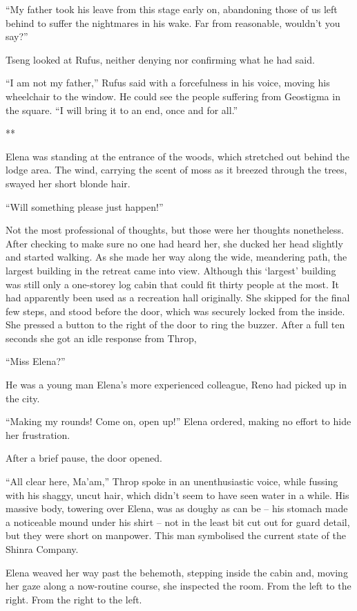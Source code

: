 \documentclass[oneside]{book}
\begin{document}
“My father took his leave from this stage early on, abandoning those of us left behind to suffer the nightmares in his wake. Far from reasonable, wouldn’t you say?”

Tseng looked at Rufus, neither denying nor confirming what he had said.

“I am not my father,” Rufus said with a forcefulness in his voice, moving his wheelchair to the window. He could see the people suffering from Geostigma in the square. “I will bring it to an end, once and for all.”

**

Elena was standing at the entrance of the woods, which stretched out behind the lodge area. The wind, carrying the scent of moss as it breezed through the trees, swayed her short blonde hair.

“Will something please just happen!”

Not the most professional of thoughts, but those were her thoughts nonetheless. After checking to make sure no one had heard her, she ducked her head slightly and started walking. As she made her way along the wide, meandering path, the largest building in the retreat came into view. Although this ‘largest’ building was still only a one-storey log cabin that could fit thirty people at the most. It had apparently been used as a recreation hall originally. She skipped for the final few steps, and stood before the door, which was securely locked from the inside. She pressed a button to the right of the door to ring the buzzer. After a full ten seconds she got an idle response from Throp,

“Miss Elena?”

He was a young man Elena’s more experienced colleague, Reno had picked up in the city.

“Making my rounds! Come on, open up!” Elena ordered, making no effort to hide her frustration.

After a brief pause, the door opened.

“All clear here, Ma’am,” Throp spoke in an unenthusiastic voice, while fussing with his shaggy, uncut hair, which didn’t seem to have seen water in a while. His massive body, towering over Elena, was as doughy as can be – his stomach made a noticeable mound under his shirt – not in the least bit cut out for guard detail, but they were short on manpower. This man symbolised the current state of the Shinra Company.

Elena weaved her way past the behemoth, stepping inside the cabin and, moving her gaze along a now-routine course, she inspected the room. From the left to the right. From the right to the left.
\end{document}
